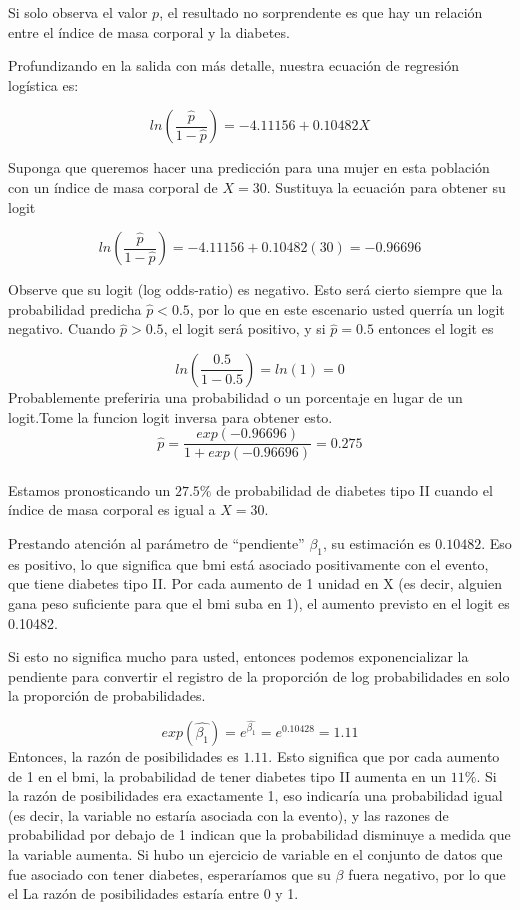 \documentclass[
]{book}
\begin{document}
Si solo observa el valor \(p\), el resultado no sorprendente es que hay un relación entre el índice de masa corporal y la diabetes.

Profundizando en la salida con más detalle, nuestra ecuación de regresión logística es:

\[ ln(\frac{\hat{p}}{1-\hat{p}})=-4.11156+0.10482X \]

Suponga que queremos hacer una predicción para una mujer en esta población con un índice de masa corporal de \(X= 30\). Sustituya la ecuación para obtener su logit

\[
ln(\frac{\hat{p}}{1-\hat{p}})=-4.11156+0.10482(30)=-0.96696
\]

Observe que su logit (log odds-ratio) es negativo. Esto será cierto siempre que la probabilidad predicha \(\hat{p}<0.5\), por lo que en este escenario usted querría un logit negativo. Cuando \(\hat{p}>0.5\), el logit será positivo, y si \(\hat{p}= 0.5\) entonces el logit es

\[
ln(\frac{0.5}{1-0.5})=ln(1)=0
\]
Probablemente preferiria una probabilidad o un porcentaje en lugar de un logit.Tome la funcion logit inversa para obtener esto.\\
\[\hat{p}=\frac{exp(-0.96696)}{1+exp(-0.96696)}=0.275 \]\\
Estamos pronosticando un \(27.5\%\) de probabilidad de diabetes tipo II cuando el índice de masa corporal es igual a \(X=30\).

Prestando atención al parámetro de ``pendiente'' \(\beta_1\), su estimación es \(0.10482\). Eso es positivo, lo que significa que bmi está asociado positivamente con el evento, que tiene diabetes tipo II. Por cada aumento de 1 unidad en X (es decir, alguien gana peso suficiente para que el bmi suba en 1), el aumento previsto en el logit es 0.10482.

Si esto no significa mucho para usted, entonces podemos exponencializar la pendiente para convertir el registro de la proporción de log probabilidades en solo la proporción de probabilidades.

\[exp(\hat{\beta_1})=e^{\hat{\beta_1}}=e^{0.10428}=1.11 \]
Entonces, la razón de posibilidades es \(1.11\). Esto significa que por cada aumento de 1 en el bmi, la probabilidad
de tener diabetes tipo II aumenta en un \(11\%\). Si la razón de posibilidades era exactamente 1, eso
indicaría una probabilidad igual (es decir, la variable no estaría asociada con la
evento), y las razones de probabilidad por debajo de 1 indican que la probabilidad disminuye a medida que la variable
aumenta. Si hubo un ejercicio de variable en el conjunto de datos que fue
asociado con tener diabetes, esperaríamos que su \(\beta\) fuera negativo, por lo que el
La razón de posibilidades estaría entre 0 y 1.
\end{document}
